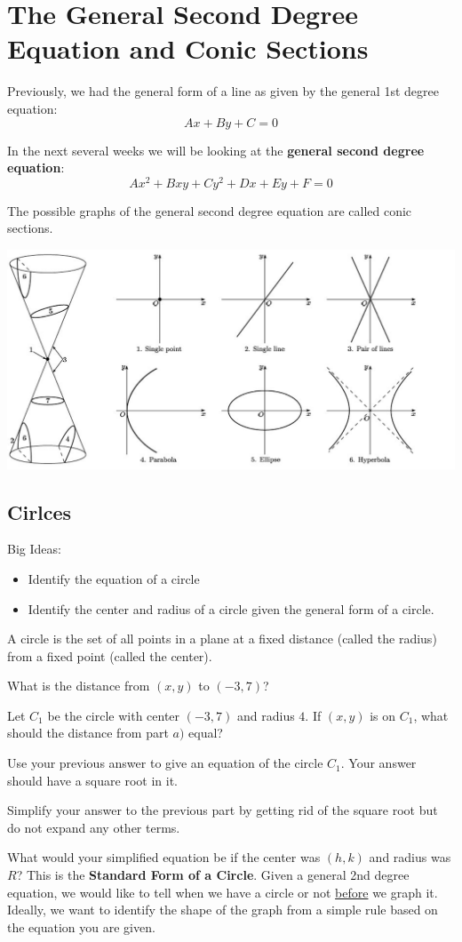 \chapter{The General Second Degree Equation and Conic Sections}

\begin{info} Previously, we had the general form of a line as given by the general 1st degree equation: $$Ax+By+C=0$$

In the next several weeks we will be looking at the \textbf{general second degree equation}: $$Ax^2+Bxy+Cy^2+Dx+Ey+F=0$$

The possible graphs of the general second degree equation are called conic sections.
\begin{center}\includegraphics[scale=.4]{conics.png}\end{center}
\end{info}
\section{Cirlces}
Big Ideas:
\begin{itemize}
\item Identify the equation of a circle
\item Identify the center and radius of a circle given the general form of a circle.
\end{itemize}
\begin{info} A circle is the set of all points in a plane at a fixed distance (called the radius) from a fixed point (called the center).
\end{info}
\bq
\be
\item What is the distance from $(x,y)$ to $(-3,7)$?
\item Let $C_1$ be the circle with center $(-3,7)$ and radius $4$. If $(x,y)$ is on $C_1$, what should the distance from part $a)$ equal?
\item Use your previous answer to give an equation of the circle $C_1$. Your answer should have a square root in it.
\item Simplify your answer to the previous part by getting rid of the square root but do not expand any other terms.
\item What would your simplified equation be if the center was $(h,k)$ and radius was $R$? This is the \textbf{Standard Form of a Circle}.
\ee
\eq
Given a general 2nd degree equation, we would like to tell when we have a circle or not \underline{before} we graph it. Ideally, we want to identify the shape of the graph from a simple rule based on the equation you are given.

